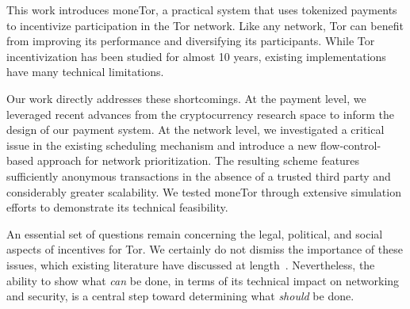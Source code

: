 This work introduces moneTor, a practical system that uses tokenized payments to incentivize participation in the Tor network.
Like any network, Tor can benefit from improving its performance and diversifying its participants.
While Tor incentivization has been studied for almost 10 years, existing implementations have many technical limitations.

Our work directly addresses these shortcomings.
At the payment level, we leveraged recent advances from the cryptocurrency research space to inform the design of our payment system.
At the network level, we investigated a critical issue in the existing scheduling mechanism and introduce a new flow-control-based approach for network prioritization.
The resulting scheme features sufficiently anonymous transactions in the absence of a trusted third party and considerably greater scalability.
We tested moneTor through extensive simulation efforts to demonstrate its technical feasibility.

An essential set of questions remain concerning the legal, political, and social aspects of incentives for Tor.
We certainly do not dismiss the importance of these issues, which existing literature have discussed at length~\cite{jansenblogpost}.
Nevertheless, the ability to show what \emph{can} be done, in terms of its technical impact on networking and security, is a central step toward determining what \emph{should} be done.

